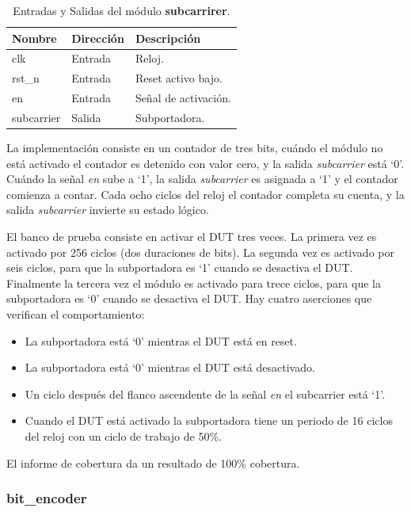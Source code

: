 \documentclass[a4paper, twoside, 11pt]{report}
\begin{document}
\begin{table}[htb]
  \centering
  \tablezebra
  \begin{tabulary}{\linewidth}{l|l|L}
    \textbf{Nombre}&\textbf{Dirección}&\textbf{Descripción} \\
    \hline
    clk&Entrada&Reloj. \\
    rst\_n&Entrada&Reset activo bajo. \\
    en&Entrada&Señal de activación. \\
    subcarrier&Salida&Subportadora. \\
  \end{tabulary}
  \caption{Entradas y Salidas del módulo \textbf{subcarrirer}.}
  \label{tab:ports_subcarrier}
\end{table}

La implementación consiste en un contador de tres bits, cuándo el módulo no está activado el contador es detenido con valor cero, y la salida \textit{subcarrier} está ‘0’. Cuándo la señal \textit{en} sube a ‘1’, la salida \textit{subcarrier} es asignada a ‘1’ y el contador comienza a contar. Cada ocho ciclos del reloj el contador completa su cuenta, y la salida \textit{subcarrier} invierte su estado lógico.

El banco de prueba consiste en activar el DUT tres veces. La primera vez es activado por 256 ciclos (dos duraciones de bits). La segunda vez es activado por seis ciclos, para que la subportadora es ‘1’ cuando se desactiva el DUT. Finalmente la tercera vez el módulo es activado para trece ciclos, para que la subportadora es ‘0’ cuando se desactiva el DUT. Hay cuatro aserciones que verifican el comportamiento:

\begin{itemize}
  \item La subportadora está ‘0’ mientras el DUT está en reset.
  \item La subportadora está ‘0’ mientras el DUT está desactivado.
  \item Un ciclo después del flanco ascendente de la señal \textit{en} el subcarrier está ‘1’.
  \item Cuando el DUT está activado la subportadora tiene un periodo de 16 ciclos del reloj con un ciclo de trabajo de 50\%.
\end{itemize}

El informe de cobertura da un resultado de 100\% cobertura.

\FloatBarrier
\subsubsection{bit\_encoder}
\end{document}
